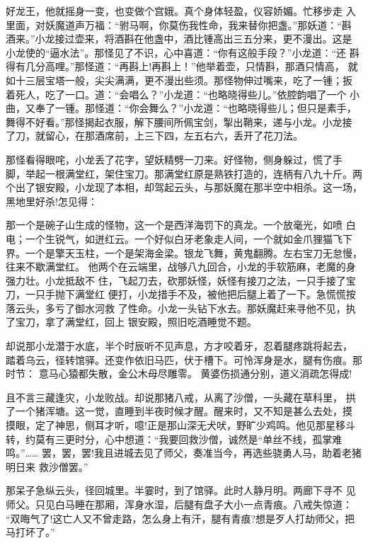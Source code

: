 好龙王，他就摇身一变，也变做个宫娥。真个身体轻盈，仪容娇媚。忙移步走
入里面，对妖魔道声万福：“驸马啊，你莫伤我性命，我来替你把盏。”那妖道：“斟
酒来。”小龙接过壶来，将酒斟在他盏中，酒比锺高出三五分来，更不漫出。这是
小龙使的“逼水法”。那怪见了不识，心中喜道：“你有这般手段？”小龙道：“还
斟得有几分高哩。”那怪道：“再斟上!再斟上！”他举着壶，只情斟，那酒只情高，
就如十三层宝塔一般，尖尖满满，更不漫出些须。那怪物伸过嘴来，吃了一锺；扳
着死人，吃了一口。道：“会唱么？”小龙道：“也略晓得些儿。”依腔韵唱了一个
小曲，又奉了一锺。那怪道：“你会舞么？”小龙道：“也略晓得些儿；但只是素手，
舞得不好看。”那怪揭起衣服，解下腰间所佩宝剑，掣出鞘来，递与小龙。小龙接
了刀，就留心，在那酒席前，上三下四，左五右六，丢开了花刀法。

那怪看得眼咤，小龙丢了花字，望妖精劈一刀来。好怪物，侧身躲过，慌了手
脚，举起一根满堂红，架住宝刀。那满堂红原是熟铁打造的，连柄有八九十斤。两
个出了银安殿，小龙现了本相，却驾起云头，与那妖魔在那半空中相杀。这一场，
黑地里好杀!怎见得：

那一个是碗子山生成的怪物，这一个是西洋海罚下的真龙。一个放毫光，如喷
白电；一个生锐气，如迸红云。一个好似白牙老象走人间，一个就如金爪狸猫飞下
界。一个是擎天玉柱，一个是架海金梁。银龙飞舞，黄鬼翻腾。左右宝刀无怠慢，
往来不歇满堂红。
他两个在云端里，战够八九回合，小龙的手软筋麻，老魔的身强力壮。小龙抵敌不
住，飞起刀去，砍那妖怪，妖怪有接刀之法，一只手接了宝刀，一只手抛下满堂红
便打，小龙措手不及，被他把后腿上着了一下。急慌慌按落云头，多亏了御水河救
了性命。小龙一头钻下水去。那妖魔赶来寻他不见，执了宝刀，拿了满堂红，回上
银安殿，照旧吃酒睡觉不题。

却说那小龙潜于水底，半个时辰听不见声息，方才咬着牙，忍着腿疼跳将起去，
踏着乌云，径转馆驿。还变作依旧马匹，伏于槽下。可怜浑身是水，腿有伤痕。那
时节：
意马心猿都失散，金公木母尽雕零。
黄婆伤损通分别，道义消疏怎得成!

且不言三藏逢灾，小龙败战。却说那猪八戒，从离了沙僧，一头藏在草科里，
拱了一个猪浑塘。这一觉，直睡到半夜时候才醒。醒来时，又不知是甚么去处，摸
摸眼，定了神思，侧耳才听，噫!正是那山深无犬吠，野旷少鸡鸣。他见那星移斗
转，约莫有三更时分，心中想道：“我要回救沙僧，诚然是“单丝不线，孤掌难鸣。”……
罢，罢，罢!我且进城去见了师父，奏准当今，再选些骁勇人马，助着老猪明日来
救沙僧罢。”

那呆子急纵云头，径回城里。半霎时，到了馆驿。此时人静月明。两廊下寻不
见师父。只见白马睡在那厢，浑身水湿，后腿有盘子大小一点青痕。八戒失惊道：
“双晦气了!这亡人又不曾走路，怎么身上有汗，腿有青痕?想是歹人打劫师父，把
马打坏了。”

